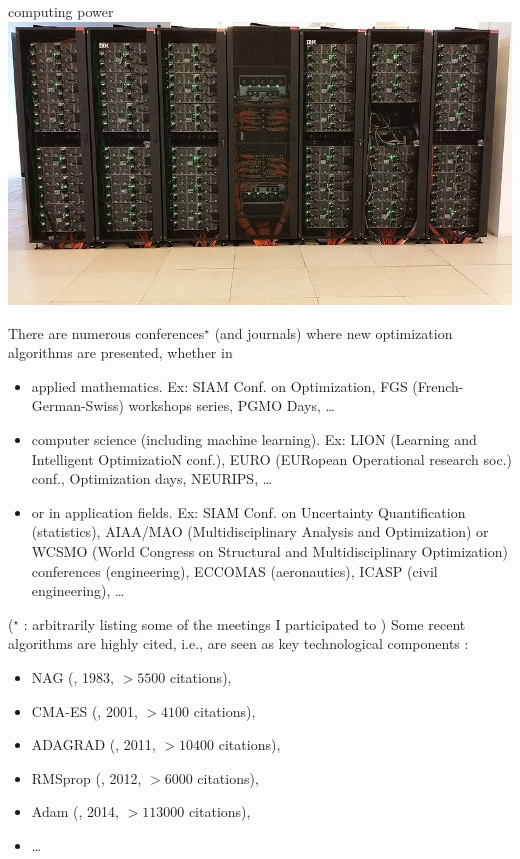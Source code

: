 \documentclass[12pt]{beamer}
\begin{document}
\begin{frame}[allowframebreaks]
\begin{minipage}[t]{0.2\textwidth}
\centering
computing power 
\\\vskip 0.2cm
\includegraphics[width=\textwidth]{Figures/supercomputer.jpg} 
\end{minipage} 
\newpage
There are numerous conferences$^\star$ (and journals) where new optimization algorithms are presented, whether in 
\begin{itemize}
\item applied mathematics. Ex: {\scriptsize SIAM Conf. on Optimization, FGS (French-German-Swiss) workshops series, PGMO Days, \ldots}
\item computer science (including machine learning). Ex: {\scriptsize LION (Learning and Intelligent OptimizatioN conf.), EURO (EURopean Operational research soc.) conf., Optimization days, NEURIPS, \ldots}
\item or in application fields. Ex: {\scriptsize SIAM Conf. on Uncertainty Quantification (statistics), AIAA/MAO (Multidisciplinary Analysis and Optimization) or WCSMO (World Congress on Structural and Multidisciplinary Optimization) conferences (engineering), ECCOMAS (aeronautics), ICASP (civil engineering), \ldots}
\end{itemize}
\hfill($^\star$ {\scriptsize : arbitrarily listing some of the meetings I participated to} )
\newpage
Some recent algorithms are highly cited, i.e., are seen as key technological components : 
\begin{itemize}
\item NAG (\cite{nesterov1983method}, 1983, $>5500$ citations),
\item CMA-ES (\cite{hansen2001completely}, 2001, $>4100$ citations),
\item ADAGRAD (\cite{duchi2011adaptive}, 2011, $>10400$ citations),
\item RMSprop (\cite{tieleman2012lecture}, 2012, $>6000$ citations),
\item Adam (\cite{kingma2014adam}, 2014, $>113000$ citations),
\item \ldots
\end{itemize}
\end{frame}
\end{document}
